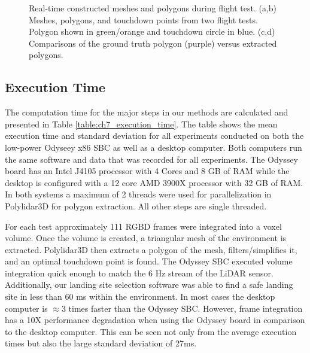 \begin{figure}[!htb]
\begin{subfigure}[t]{.35\linewidth}
    \caption{\label{fig:ch7_flight_poly_b}}
  \end{subfigure}
  \caption[Real-time constructed meshes and polygons during flight test]{Real-time constructed meshes and polygons during flight test. (a,b) Meshes, polygons, and touchdown points from two flight tests. Polygon shown in green/orange and touchdown circle in blue. (c,d) Comparisons of the ground truth polygon (purple) versus extracted polygons. }\label{fig:ch7_mesh_flight}
\end{figure}




\subsection{Execution Time} \label{sec:ch7_results_execution_time}

The computation time for the major steps in our methods are calculated and presented in Table \ref{table:ch7_execution_time}. The table shows the mean execution time and standard deviation for all experiments conducted on both the low-power Odyseey x86 \ac{SBC} as well as a desktop computer. Both computers run the same software and data that was recorded for all experiments. The Odyssey board has an Intel J4105 processor with 4 Cores and 8 GB of RAM while the desktop is configured with a 12 core AMD 3900X processor with 32 GB of RAM. In both systems a maximum of 2 threads were used for parallelization in Polylidar3D for polygon extraction. All other steps are single threaded. 

For each test approximately 111 \ac{RGBD} frames were integrated into a voxel volume.  Once the volume is created, a triangular mesh of the environment is extracted.  Polylidar3D then extracts a polygon of the mesh, filters/simplifies it, and an optimal touchdown point is found. The Odyssey \ac{SBC} executed volume integration quick enough to match the 6 Hz stream of the LiDAR sensor. Additionally, our landing site selection software was able to find a safe landing site in less than 60 ms within the environment. In most cases the desktop computer is $\approx3$ times faster than the Odyssey \ac{SBC}. However, frame integration has a 10X performance degradation when using the Odyssey board in comparison to the desktop computer.  This can be seen not only from the average execution times but also the large standard deviation of 27ms. 

